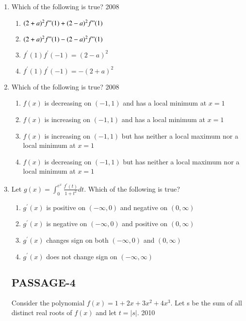\documentclass[journal,12pt,onecolumn]{IEEEtran}
\theoremstyle{remark}
\begin{document}
\begin{enumerate}
 \item Which of the following is true?
\hfill{2008}
\begin{enumerate}
    \item $(2+a)^2 f"(1)+(2-a)^2 f"(1)$ 
    \item $(2+a)^2 f"(1)-(2-a)^2 f"(1)$
    \item $f^{\prime}(1)f^{\prime}(-1)=(2-a)^2$ 
    \item $f^{\prime}(1)f^{\prime}(-1)=-(2+a)^2$ 
\end{enumerate}
\item Which of the following is true?
\hfill{2008}
\begin{enumerate}
    \item $f(x)$ is decreasing on $(-1,1)$ and has a local minimum at $x=1$
    \item $f(x)$ is increasing on $(-1,1)$ and has a local minimum at $x=1$
    \item $f(x)$  is increasing on $(-1,1)$ but has neither a local maximum nor a local minimum at $x=1$
    \item $f(x)$  is decreasing on $(-1,1)$ but has neither a local maximum nor a local minimum at $x=1$
\end{enumerate}
\item Let $g(x)=\int_{0}^{e^x}\frac{f^{\prime}(t)}{1+t^2}dt$. Which of the following is true?
\begin{enumerate}
	\item $g^{\prime}(x)$ is positive on $(-\infty,0)$ and negative on $(0,\infty)$
	\item $g^{\prime}(x)$ is negative on $(-\infty,0)$ and positive on $(0,\infty)$
	\item $g^{\prime}(x)$ changes sign on both $(-\infty,0)$ and $(0,\infty)$
	\item $g^{\prime}(x)$ does not change sign on $(-\infty,\infty)$  
\end{enumerate}
\subsection{PASSAGE-4}

Consider the polynomial $f(x) = 1+2x+3x^2+4x^3$. Let s be the sum of all distinct real roots of $f(x)$ and let $t=|s|$.
\hfill{2010}


\end{enumerate}
\end{document}
